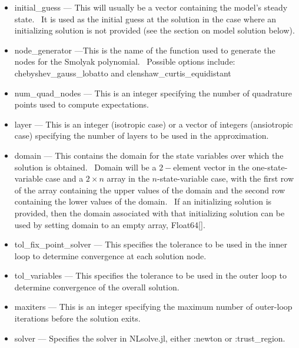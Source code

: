 \documentclass[notitlepage,11pt]{article}
\begin{document}
\begin{itemize}
\item initial\_guess --- This will usually be a vector containing the
model's steady state. \ It is used as the initial guess at the solution in
the case where an initializing solution is not provided (see the section on
model solution below).

\item node\_generator ---This is the name of the function used to generate
the nodes for the Smolyak polynomial. \ Possible options include:
chebyshev\_gauss\_lobatto and clenshaw\_curtis\_equidistant

\item num\_quad\_nodes --- This is an integer specifying the number of
quadrature points used to compute expectations.

\item layer --- This is an integer (isotropic case) or a vector of integers
(ansiotropic case) specifying the number of layers to be used in the
approximation.

\item domain --- This contains the domain for the state variables over which
the solution is obtained. \ Domain will be a $2-$element vector in the
one-state-variable case and a $2\times n$ array in the $n$-state-variable
case, with the first row of the array containing the upper values of the
domain and the second row containing the lower values of the domain. \ If an
initializing solution is provided, then the domain associated with that
initializing solution can be used by setting domain to an empty array,
Float64[].

\item tol\_fix\_point\_solver --- This specifies the tolerance to be used in
the inner loop to determine convergence at each solution node.

\item tol\_variables --- This specifies the tolerance to be used in the
outer loop to determine convergence of the overall solution.

\item maxiters --- This is an integer specifying the maximum number of
outer-loop iterations before the solution exits.

\item solver --- Specifies the solver in NLsolve.jl, either :newton or
:trust\_region.
\end{itemize}

\bigskip
\end{document}

